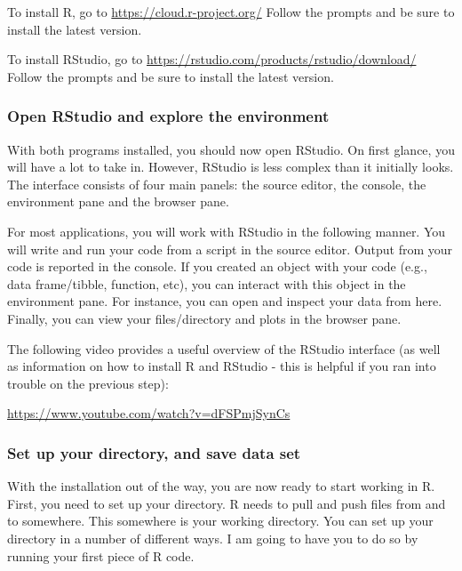 \documentclass[
]{article}
\begin{document}
To install R, go to \url{https://cloud.r-project.org/} Follow the
prompts and be sure to install the latest version.

To install RStudio, go to
\url{https://rstudio.com/products/rstudio/download/} Follow the prompts
and be sure to install the latest version.

\hypertarget{open-rstudio-and-explore-the-environment}{%
\subsubsection{Open RStudio and explore the
environment}\label{open-rstudio-and-explore-the-environment}}

With both programs installed, you should now open RStudio. On first
glance, you will have a lot to take in. However, RStudio is less complex
than it initially looks. The interface consists of four main panels: the
source editor, the console, the environment pane and the browser pane.

For most applications, you will work with RStudio in the following
manner. You will write and run your code from a script in the source
editor. Output from your code is reported in the console. If you created
an object with your code (e.g., data frame/tibble, function, etc), you
can interact with this object in the environment pane. For instance, you
can open and inspect your data from here. Finally, you can view your
files/directory and plots in the browser pane.

The following video provides a useful overview of the RStudio interface
(as well as information on how to install R and RStudio - this is
helpful if you ran into trouble on the previous step):

\url{https://www.youtube.com/watch?v=dFSPmjSynCs}

\hypertarget{set-up-your-directory-and-save-data-set}{%
\subsubsection{Set up your directory, and save data
set}\label{set-up-your-directory-and-save-data-set}}

With the installation out of the way, you are now ready to start working
in R. First, you need to set up your directory. R needs to pull and push
files from and to somewhere. This somewhere is your working directory.
You can set up your directory in a number of different ways. I am going
to have you to do so by running your first piece of R code.
\end{document}
